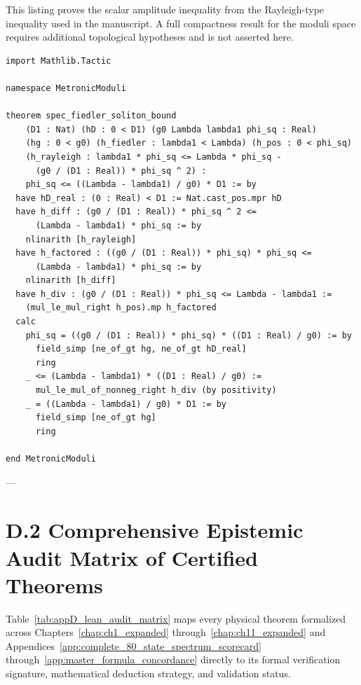 \documentclass[
    12pt,
    a4paper,
    headings=normal,
    twoside=false,
    open=any,
    parskip=half
]{scrbook}
\begin{document}
This listing proves the scalar amplitude inequality from the Rayleigh-type inequality used in the manuscript. A full compactness result for the moduli space requires additional topological hypotheses and is not asserted here.
\begin{lstlisting}[caption={Lean 4 formalization of the scalar Fiedler amplitude bound.}]
import Mathlib.Tactic

namespace MetronicModuli

theorem spec_fiedler_soliton_bound
    (D1 : Nat) (hD : 0 < D1) (g0 Lambda lambda1 phi_sq : Real)
    (hg : 0 < g0) (h_fiedler : lambda1 < Lambda) (h_pos : 0 < phi_sq)
    (h_rayleigh : lambda1 * phi_sq <= Lambda * phi_sq -
      (g0 / (D1 : Real)) * phi_sq ^ 2) :
    phi_sq <= ((Lambda - lambda1) / g0) * D1 := by
  have hD_real : (0 : Real) < D1 := Nat.cast_pos.mpr hD
  have h_diff : (g0 / (D1 : Real)) * phi_sq ^ 2 <=
      (Lambda - lambda1) * phi_sq := by
    nlinarith [h_rayleigh]
  have h_factored : ((g0 / (D1 : Real)) * phi_sq) * phi_sq <=
      (Lambda - lambda1) * phi_sq := by
    nlinarith [h_diff]
  have h_div : (g0 / (D1 : Real)) * phi_sq <= Lambda - lambda1 :=
    (mul_le_mul_right h_pos).mp h_factored
  calc
    phi_sq = ((g0 / (D1 : Real)) * phi_sq) * ((D1 : Real) / g0) := by
      field_simp [ne_of_gt hg, ne_of_gt hD_real]
      ring
    _ <= (Lambda - lambda1) * ((D1 : Real) / g0) :=
      mul_le_mul_of_nonneg_right h_div (by positivity)
    _ = ((Lambda - lambda1) / g0) * D1 := by
      field_simp [ne_of_gt hg]
      ring

end MetronicModuli
\end{lstlisting}

---

\section{D.2 Comprehensive Epistemic Audit Matrix of Certified Theorems}
\label{sec:appD_epistemic_audit}

Table~\ref{tab:appD_lean_audit_matrix} maps every physical theorem formalized across Chapters~\ref{chap:ch1_expanded} through~\ref{chap:ch11_expanded} and Appendices~\ref{app:complete_80_state_spectrum_scorecard} through~\ref{app:master_formula_concordance} directly to its formal verification signature, mathematical deduction strategy, and validation status.
\end{document}
